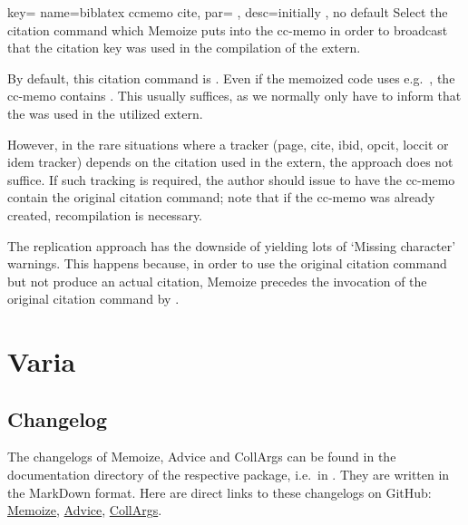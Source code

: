 \documentclass[a4paper,11pt]{article}
\begin{document}
\begin{doc}{
    key={
      name=biblatex ccmemo cite,
      par={%
      },
      desc={initially , no default}
    }
  }
  Select the citation command which Memoize puts into the cc-memo in order to
  broadcast that the citation key was used in the compilation of the extern.

  By default, this citation command is .  Even if the memoized code
  uses e.g.\ , the cc-memo contains
  .  This usually suffices, as we
  normally only have to inform  that the  was
  used in the utilized extern.

  However, in the rare situations where a tracker (page, cite, ibid, opcit,
  loccit or idem tracker) depends on the citation used in the extern, the
   approach does not suffice.  If such tracking is required, the
  author should issue  to have the cc-memo contain the original citation
  command; note that if the cc-memo was already created, recompilation is
  necessary.

  The replication approach has the downside of yielding lots of `Missing
  character' warnings.  This happens because, in order to use the original
  citation command but not produce an actual citation, Memoize precedes the
  invocation of the original citation command by .
\end{doc}

\section{Varia}

\subsectionclearpagefalse


\subsection{Changelog}

The changelogs of Memoize, Advice and CollArgs can be found in the
documentation directory of the respective package, i.e.\ in
.  They are written
in the MarkDown format.  Here are direct links to these changelogs on
GitHub:
\href{https://github.com/sasozivanovic/memoize/blob/main/CHANGELOG.md}{Memoize},
\href{https://github.com/sasozivanovic/memoize/blob/main/doc/CHANGELOG.advice.md}{Advice},
\href{https://github.com/sasozivanovic/memoize/blob/main/doc/CHANGELOG.collargs.md}{CollArgs}.
\end{document}
